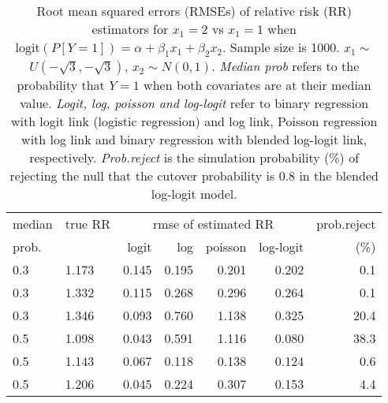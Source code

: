 \documentclass[12pt,a4paper]{article}
\begin{document}
\begin{table}[H] 
\small\sf\centering 
\caption{Root mean squared errors (RMSEs) of relative risk (RR) estimators for $x_1=2$ vs $x_1=1$ when $\mbox{logit}(P[Y=1])=\alpha+\beta_1 x_1 + \beta_2 x_2$. Sample size is 1000. $x_1 \sim $$U(-\sqrt{3},-\sqrt{3})$, $x_2 \sim N(0,1)$. {\it Median prob} refers to the probability that $Y=1$ when both covariates are at their median value. {\it Logit, log, poisson and log-logit} refer to binary regression with logit link (logistic regression) and log link, Poisson regression with log link and binary regression with blended log-logit link, respectively. {\it Prob.reject} is the simulation probability (\%) of rejecting the null that the cutover probability is $0.8$ in the blended log-logit model.} 
\begin{tabular}{llrrrrr} 
\toprule 
median & true RR & \multicolumn{4}{c}{rmse of estimated RR} & prob.reject \\ 
prob. & & logit & log & poisson & log-logit  & (\%) \\ \midrule 
0.3 & 1.173 & 0.145 & 0.195 & 0.201 & 0.202 &  0.1 \\  
0.3 & 1.332 & 0.115 & 0.268 & 0.296 & 0.264 &  0.1 \\  
0.3 & 1.346 & 0.093 & 0.760 & 1.138 & 0.325 & 20.4 \\  
0.5 & 1.098 & 0.043 & 0.591 & 1.116 & 0.080 & 38.3 \\  
0.5 & 1.143 & 0.067 & 0.118 & 0.138 & 0.124 &  0.6 \\  
0.5 & 1.206 & 0.045 & 0.224 & 0.307 & 0.153 &  4.4 \\  
\bottomrule 
\end{tabular} 
\end{table} 
\end{document}
